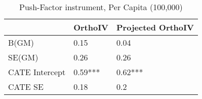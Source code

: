 \begin{table}\centering\caption{Push-Factor instrument, Per Capita (100,000)}\begin{tabular}{lll}
\toprule
                & OrthoIV   & Projected OrthoIV   \\
\midrule
 B(GM)          & 0.15      & 0.04                \\
 SE(GM)         & 0.26      & 0.26                \\
 CATE Intercept & 0.59***   & 0.62***             \\
 CATE SE        & 0.18      & 0.2                 \\
\bottomrule
\end{tabular}\end{table}